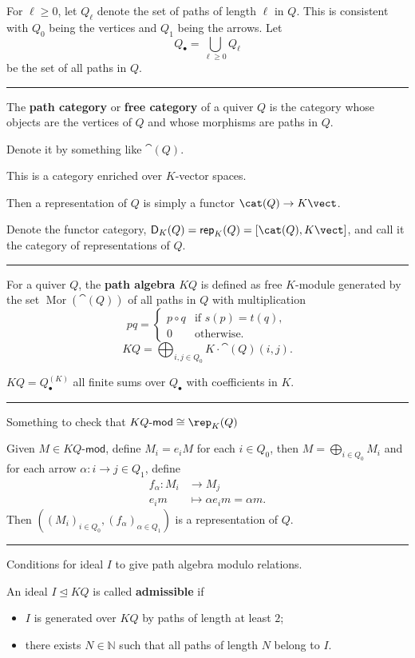 \documentclass[12pt]{article}
\newcommand{\keyword}[1]{\textbf{#1}}
\newcommand{\sepline}{\rule{\textwidth}{0.4pt}}
\theoremstyle{definition}
\newcommand{\N}{\mathbb{N}}
\newcommand{\<}{\langle}
\renewcommand{\>}{\rangle}
\newcommand{\iso}{\cong}
\newcommand{\teq}{\trianglelefteq}
\DeclareMathOperator{\Mor}{Mor}
\newcommand{\mathcat}{\mathsf}
\renewcommand{\mod}{\mathsf{\text{-}mod}}
\renewcommand{\_}[1]{{_{#1}}}
\begin{document}
For $\ell \geq 0$, let $Q_\ell$ denote the set of paths of length $\ell$ in $Q$.
This is consistent with $Q_0$ being the vertices and $Q_1$ being the arrows.
Let
\[
    Q_\bullet = \bigcup_{\ell \geq 0} Q_\ell
\]
be the set of all paths in $Q$.

\sepline

The \keyword{path category} or \keyword{free category} of a quiver $Q$ is the category whose objects are the vertices of $Q$ and whose morphisms are paths in $Q$.

Denote it by something like $\cat(Q)$.

This is a category enriched over $K$-vector spaces.

Then a representation of $Q$ is simply a functor $\cat(Q) \to K\vect$.

Denote the functor category, $\mathcat{D}_K(Q) = \mathcat{rep}_K(Q) = [\cat(Q), K\vect]$, and call it the category of representations of $Q$.

\sepline

For a quiver $Q$, the \keyword{path algebra} $KQ$ is defined as free $K$-module generated by the set $\Mor(\cat(Q))$ of all paths in $Q$ with multiplication
\[
    pq = \begin{cases}
        p \circ q & \text{if } s(p) = t(q), \\
        0 & \text{otherwise}.
    \end{cases}
\]
\[
    KQ = \bigoplus_{i,j \in Q_0} K \cdot \cat(Q)(i, j).
\]

$KQ = Q_\bullet^{(K)}$ all finite sums over $Q_\bullet$ with coefficients in $K$.


\sepline

Something to check that $KQ\mod \iso \rep_K(Q)$

Given $M \in KQ\mod$, define $M_i = e_iM$ for each $i \in Q_0$, then $M = \bigoplus_{i \in Q_0} M_i$
and for each arrow $\alpha : i \to j \in Q_1$, define
\begin{align*}
    f_\alpha : M_i &\longrightarrow M_j \\
        e_im &\longmapsto \alpha e_im = \alpha m.
\end{align*}
Then $((M_i)_{i \in Q_0}, (f_\alpha)_{\alpha \in Q_1})$ is a representation of $Q$.

\sepline

Conditions for ideal $I$ to give path algebra modulo relations.

An ideal $I \teq KQ$ is called \keyword{admissible} if
\begin{itemize}
    \item $I$ is generated over $KQ$ by paths of length at least $2$;
    \item there exists $N \in \N$ such that all paths of length $N$ belong to $I$.
\end{itemize}
\end{document}
